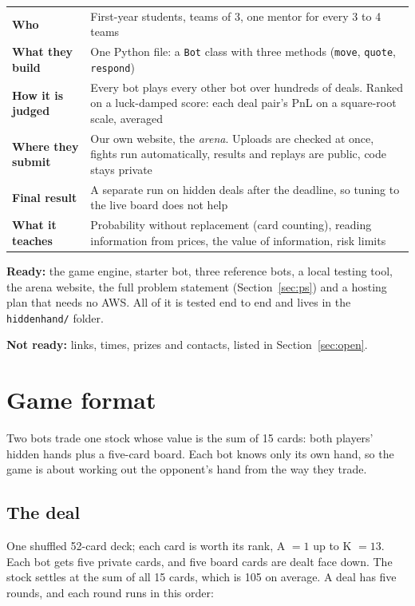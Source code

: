 \documentclass[11pt,a4paper]{article}
\newcommand{\code}[1]{\texttt{#1}}
\begin{document}
\begin{center}
\begin{tabularx}{\linewidth}{@{}lL@{}}
\toprule
\textbf{Who} & First-year students, teams of 3, one mentor for every 3 to 4 teams \\
\textbf{What they build} & One Python file: a \code{Bot} class with three methods
  (\code{move}, \code{quote}, \code{respond}) \\
\textbf{How it is judged} & Every bot plays every other bot over hundreds of deals.
  Ranked on a luck-damped score: each deal pair's PnL on a square-root scale, averaged \\
\textbf{Where they submit} & Our own website, the \emph{arena}. Uploads are checked at once,
  fights run automatically, results and replays are public, code stays private \\
\textbf{Final result} & A separate run on hidden deals after the deadline, so tuning to the
  live board does not help \\
\textbf{What it teaches} & Probability without replacement (card counting), reading
  information from prices, the value of information, risk limits \\
\bottomrule
\end{tabularx}
\end{center}

\textbf{Ready:} the game engine, starter bot, three reference bots, a local testing tool, the
arena website, the full problem statement (Section~\ref{sec:ps}) and a hosting plan that needs
no AWS. All of it is tested end to end and lives in the \code{hiddenhand/} folder.

\textbf{Not ready:} links, times, prizes and contacts, listed in Section~\ref{sec:open}.

\section{Game format}

Two bots trade one stock whose value is the sum of 15 cards: both players' hidden hands plus a
five-card board. Each bot knows only its own hand, so the game is about working out the
opponent's hand from the way they trade.

\subsection{The deal}

One shuffled 52-card deck; each card is worth its rank, A $=1$ up to K $=13$. Each bot gets
five private cards, and five board cards are dealt face down. The stock settles at the sum of
all 15 cards, which is 105 on average. A deal has five rounds, and each round runs in this
order:
\end{document}
